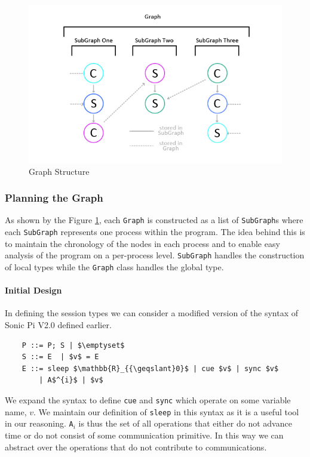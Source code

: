 \documentclass[11pt, abstracton, twoside, titlepage=true]{scrartcl}
\begin{document}
\begin{figure}[h!]
	\centering
	\includegraphics[width=\textwidth]{images/GSG.jpg}
	\caption{Graph Structure} \label{graphStructure}
\end{figure}

\subsubsection{Planning the Graph}
As shown by the Figure \ref{graphStructure}, each \texttt{Graph} is constructed as
a list of \texttt{SubGraph}s where each \texttt{SubGraph} represents
one process within the program. The idea behind this is to maintain
the chronology of the nodes in each process and to enable easy analysis
of the program on a per-process level. \texttt{SubGraph} handles the construction
of local types while the \texttt{Graph} class handles the global type.

\paragraph{Initial Design}
In defining the session types we can consider a modified version of the syntax 
of Sonic Pi V2.0 defined earlier.
\\
\begin{lstlisting}
	P ::= P; S | $\emptyset$
	S ::= E  | $v$ = E
	E ::= sleep $\mathbb{R}_{{\geqslant}0}$ | cue $v$ | sync $v$ 
	    | A$^{i}$ | $v$
\end{lstlisting}

We expand the syntax to define \texttt{cue} and \texttt{sync} which operate on
some variable name, $v$. We maintain our definition of \texttt{sleep} in this syntax 
as it is a useful tool in our reasoning. \texttt{A$_{i}$} is thus the set of all 
operations that either do not advance time or do not consist of some communication
primitive. In this way we can abstract over the operations that do not contribute 
to communications.
\end{document}
